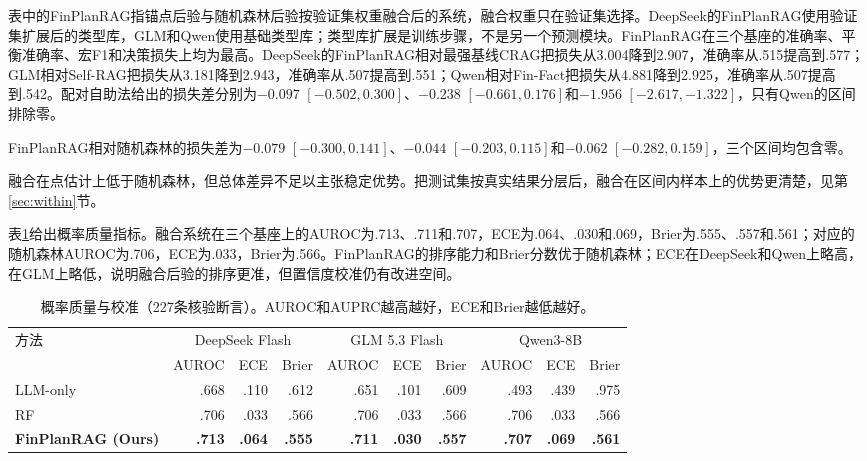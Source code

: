 表中的FinPlanRAG指锚点后验与随机森林后验按验证集权重融合后的系统，融合权重只在验证集选择。DeepSeek的FinPlanRAG使用验证集扩展后的类型库，GLM和Qwen使用基础类型库；类型库扩展是训练步骤，不是另一个预测模块。FinPlanRAG在三个基座的准确率、平衡准确率、宏F1和决策损失上均为最高。DeepSeek的FinPlanRAG相对最强基线CRAG把损失从3.004降到2.907，准确率从.515提高到.577；GLM相对Self-RAG把损失从3.181降到2.943，准确率从.507提高到.551；Qwen相对Fin-Fact把损失从4.881降到2.925，准确率从.507提高到.542。配对自助法给出的损失差分别为$-0.097$ $[-0.502,0.300]$、$-0.238$ $[-0.661,0.176]$和$-1.956$ $[-2.617,-1.322]$，只有Qwen的区间排除零。

{\sloppy FinPlanRAG相对随机森林的损失差为$-0.079$ $[-0.300,0.141]$、$-0.044$ $[-0.203,0.115]$和$-0.062$ $[-0.282,0.159]$，三个区间均包含零。\par}融合在点估计上低于随机森林，但总体差异不足以主张稳定优势。把测试集按真实结果分层后，融合在区间内样本上的优势更清楚，见第\ref{sec:within}节。

表\ref{tab:calibration}给出概率质量指标。融合系统在三个基座上的AUROC为.713、.711和.707，ECE为.064、.030和.069，Brier为.555、.557和.561；对应的随机森林AUROC为.706，ECE为.033，Brier为.566。FinPlanRAG的排序能力和Brier分数优于随机森林；ECE在DeepSeek和Qwen上略高，在GLM上略低，说明融合后验的排序更准，但置信度校准仍有改进空间。

\begin{table}[htbp]
\centering
{}
\setlength{\tabcolsep}{4pt}
\caption{概率质量与校准（227条核验断言）。AUROC和AUPRC越高越好，ECE和Brier越低越好。}
\label{tab:calibration}
\begin{tabular}{lrrrrrrrrr}
\toprule
\multirow{2}{*}{方法} & \multicolumn{3}{c}{DeepSeek Flash} & \multicolumn{3}{c}{GLM 5.3 Flash} & \multicolumn{3}{c}{Qwen3-8B} \\
\cmidrule(lr){2-4}\cmidrule(lr){5-7}\cmidrule(lr){8-10}
 & AUROC & ECE & Brier & AUROC & ECE & Brier & AUROC & ECE & Brier \\
\midrule
LLM-only & .668 & .110 & .612 & .651 & .101 & .609 & .493 & .439 & .975 \\
RF & .706 & .033 & .566 & .706 & .033 & .566 & .706 & .033 & .566 \\
\textbf{FinPlanRAG (Ours)} & \textbf{.713} & \textbf{.064} & \textbf{.555} & \textbf{.711} & \textbf{.030} & \textbf{.557} & \textbf{.707} & \textbf{.069} & \textbf{.561} \\
\bottomrule
\end{tabular}
\end{table}

